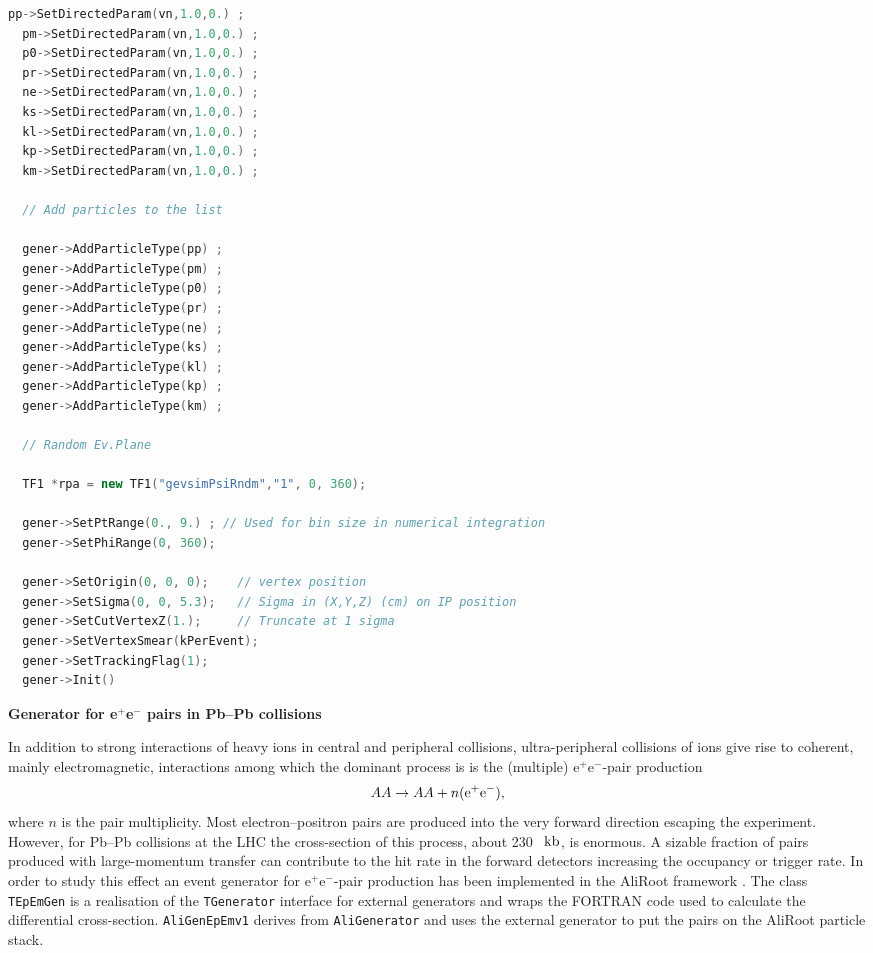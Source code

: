 \documentclass[12pt,a4paper,twoside]{article}
\begin{document}
\begin{lstlisting}[language=C++]
  pp->SetDirectedParam(vn,1.0,0.) ;
  pm->SetDirectedParam(vn,1.0,0.) ;
  p0->SetDirectedParam(vn,1.0,0.) ;
  pr->SetDirectedParam(vn,1.0,0.) ;
  ne->SetDirectedParam(vn,1.0,0.) ;
  ks->SetDirectedParam(vn,1.0,0.) ;
  kl->SetDirectedParam(vn,1.0,0.) ;
  kp->SetDirectedParam(vn,1.0,0.) ;
  km->SetDirectedParam(vn,1.0,0.) ;

  // Add particles to the list

  gener->AddParticleType(pp) ;
  gener->AddParticleType(pm) ;
  gener->AddParticleType(p0) ;
  gener->AddParticleType(pr) ;
  gener->AddParticleType(ne) ;
  gener->AddParticleType(ks) ;
  gener->AddParticleType(kl) ;
  gener->AddParticleType(kp) ;
  gener->AddParticleType(km) ;

  // Random Ev.Plane

  TF1 *rpa = new TF1("gevsimPsiRndm","1", 0, 360);

  gener->SetPtRange(0., 9.) ; // Used for bin size in numerical integration
  gener->SetPhiRange(0, 360);

  gener->SetOrigin(0, 0, 0);    // vertex position
  gener->SetSigma(0, 0, 5.3);   // Sigma in (X,Y,Z) (cm) on IP position
  gener->SetCutVertexZ(1.);     // Truncate at 1 sigma
  gener->SetVertexSmear(kPerEvent); 
  gener->SetTrackingFlag(1);
  gener->Init()
\end{lstlisting}

\textbf{Generator for e$^+$e$^-$ pairs in Pb--Pb collisions}

In addition to strong interactions of heavy ions in central and
peripheral collisions, ultra-peripheral collisions of ions give
rise to coherent, mainly electromagnetic, interactions among which
the dominant process is is the (multiple) e$^+$e$^-$-pair
production \cite{MC:AlscherHT97}
\begin{equation}
  AA \to AA + n({\rm e}^+{\rm e}^-), \label{nee}
\end{equation}
where $n$ is the pair multiplicity. Most electron--positron pairs
are produced into the very forward direction escaping the
experiment. However, for  Pb--Pb collisions at the LHC the
cross-section of this process, about 230 \, ${\rm kb}$, is
enormous. A sizable fraction of pairs produced with large-momentum
transfer can contribute to the hit rate in the forward detectors
increasing the occupancy or trigger rate. In order to study this
effect an event generator for   e$^+$e$^-$-pair production has
been implemented in the AliRoot framework \cite{MC:Sadovsky}. The
class \texttt{TEpEmGen} is a realisation of the \texttt{TGenerator}
interface for external generators and wraps the FORTRAN code used
to calculate the differential cross-section. \texttt{AliGenEpEmv1}
derives from \texttt{AliGenerator} and uses the external generator to
put the pairs on the AliRoot particle stack.
\end{document}

